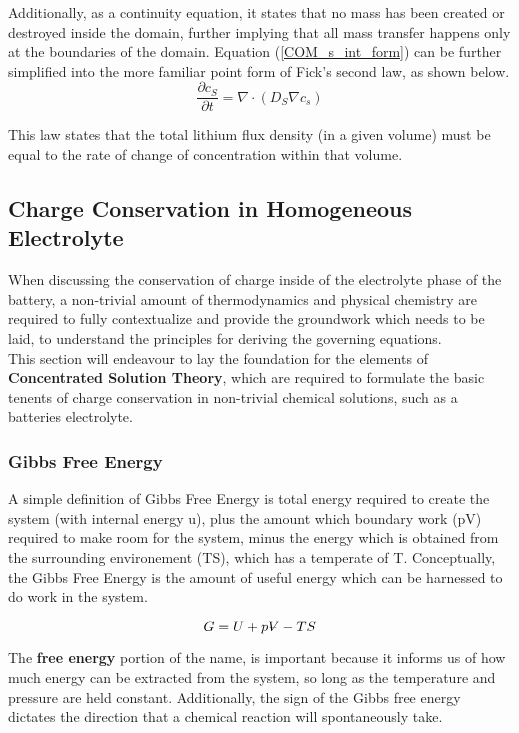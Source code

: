 \documentclass[lettersize,journal]{IEEEtran}
\newcommand{\volume}{{\ooalign{\hfil$V$\hfil\cr\kern0.08em--\hfil\cr}}}
\begin{document}
 Additionally, as a continuity equation, it states that no mass has been created or destroyed inside the domain, further implying that all mass transfer happens only at the boundaries of the domain. Equation (\ref{COM_s_int_form}) can be further simplified into the more familiar point form of Fick's second law, as shown below.
\begin{equation}
    \frac{\partial c_{S}}{\partial t} = \nabla \cdot \left( D_{S} \nabla c_{s} \right)
\end{equation}

This law states that the total lithium flux density (in a given volume) must be equal to the rate of change of concentration within that volume.


\subsection{Charge Conservation in Homogeneous Electrolyte}

When discussing the conservation of charge inside of the electrolyte phase of the battery, a non-trivial amount of thermodynamics and physical chemistry are required to fully contextualize and provide the groundwork which needs to be laid, to understand the principles for deriving the governing equations. \\

This section will endeavour to lay the foundation for the elements of \textbf{Concentrated Solution Theory}, which are required to formulate the basic tenents of charge conservation in non-trivial chemical solutions, such as a batteries electrolyte.

\subsubsection{Gibbs Free Energy}
A simple definition of Gibbs Free Energy is total energy required to create the system (with internal energy u), plus the amount which boundary work (pV) required to make room for the system, minus the energy which is obtained from the surrounding environement (TS), which has a temperate of T. Conceptually, the Gibbs Free Energy is the amount of useful energy which can be harnessed to do work in the system.

\begin{equation} \label{gibbs_free_energy}
  G = U + p{\volume} - TS
\end{equation}

 The \textbf{free energy} portion of the name, is important because it informs us of how much energy can be extracted from the system, so long as the temperature and pressure are held constant. Additionally, the sign of the Gibbs free energy dictates the direction that a chemical reaction will spontaneously take. \\
\end{document}
